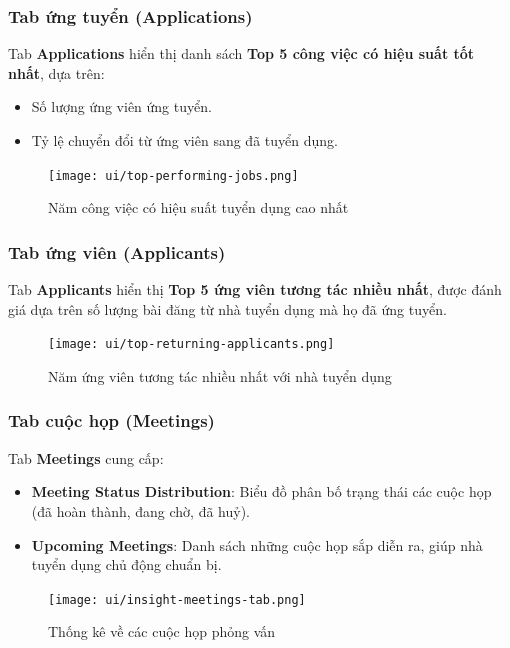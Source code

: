 \subsubsection{Tab ứng tuyển (Applications)}

Tab \textbf{Applications} hiển thị danh sách \textbf{Top 5 công việc có hiệu suất tốt nhất}, dựa trên:
\begin{itemize}
  \item Số lượng ứng viên ứng tuyển.
  \item Tỷ lệ chuyển đổi từ ứng viên sang đã tuyển dụng.
\end{itemize}

\begin{figure}[H]
  \centering
  \texttt{[image: ui/top-performing-jobs.png]}
  \caption{Năm công việc có hiệu suất tuyển dụng cao nhất}
  \label{fig:top-performing-jobs}
\end{figure}

\subsubsection{Tab ứng viên (Applicants)}

Tab \textbf{Applicants} hiển thị \textbf{Top 5 ứng viên tương tác nhiều nhất}, được đánh giá dựa trên số lượng bài đăng từ nhà tuyển dụng mà họ đã ứng tuyển.

\begin{figure}[H]
  \centering
  \texttt{[image: ui/top-returning-applicants.png]}
  \caption{Năm ứng viên tương tác nhiều nhất với nhà tuyển dụng}
  \label{fig:top-returning-applicants}
\end{figure}

\subsubsection{Tab cuộc họp (Meetings)}

Tab \textbf{Meetings} cung cấp:
\begin{itemize}
  \item \textbf{Meeting Status Distribution}: Biểu đồ phân bố trạng thái các cuộc họp (đã hoàn thành, đang chờ, đã huỷ).
  \item \textbf{Upcoming Meetings}: Danh sách những cuộc họp sắp diễn ra, giúp nhà tuyển dụng chủ động chuẩn bị.
\end{itemize}

\begin{figure}[H]
  \centering
  \texttt{[image: ui/insight-meetings-tab.png]}
  \caption{Thống kê về các cuộc họp phỏng vấn}
  \label{fig:insight-meetings-tab}
\end{figure}

